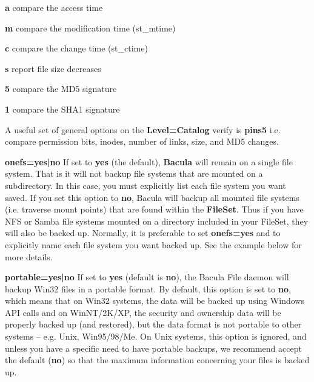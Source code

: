 \begin{description}
\begin{description}
\begin{description}
\item {\bf a}
compare the access time  

\item {\bf m}
compare the modification time (st\_mtime)  

\item {\bf c}
compare the change time (st\_ctime)  

\item {\bf s}
report file size decreases  

\item {\bf 5}
compare the MD5 signature  

\item {\bf 1}
compare the SHA1 signature  
\end{description}

A useful set of general options on the {\bf Level=Catalog}  verify is {\bf
pins5} i.e. compare permission bits, inodes, number  of links, size, and MD5
changes. 

\item {\bf onefs=yes|no}
If set to {\bf yes} (the default), {\bf Bacula}  will remain on a single file
system. That is it will not backup  file systems that are mounted on a
subdirectory.  In this case, you must explicitly list each file system you
want saved.  If you set this option to {\bf no}, Bacula will backup  all
mounted file systems (i.e. traverse mount points) that  are found within the
{\bf FileSet}. Thus if  you have NFS or Samba file systems mounted on a
directory included  in your FileSet, they will also be backed up. Normally, it
is  preferable to set {\bf onefs=yes} and to explicitly name  each file system
you want backed up.  See the example below for more details. 
\label{portable}

\item {\bf portable=yes|no}
If set to {\bf yes} (default is  {\bf no}), the Bacula File daemon will backup
Win32 files  in a portable format. By default, this option is set to  {\bf
no}, which means that on Win32 systems, the data will  be backed up using
Windows API calls and on WinNT/2K/XP,  the security and ownership data will be
properly backed up  (and restored), but the data format is not portable to
other  systems -- e.g. Unix, Win95/98/Me. On Unix systems, this  option is
ignored, and unless you have a specific need to  have portable backups, we
recommend accept the default  ({\bf no}) so that the maximum information
concerning  your files is backed up. 


\end{description}
\end{description}
